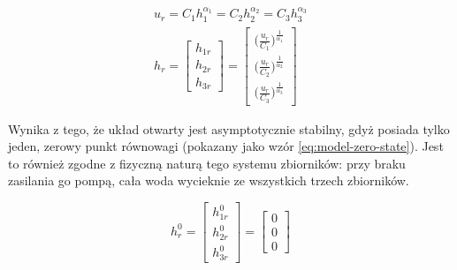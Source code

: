 \begin{equation}\label{eq:model-steady-state}
\begin{array}{lr}
u_{r} = C_{1}h_{1}^{\alpha_{1}} = C_{2}h_{2}^{\alpha_{2}} = C_{3}h_{3}^{\alpha_{3}}\\
h_{r} = \begin{bmatrix}
h_{1r}\\h_{2r}\\h_{3r}
\end{bmatrix}
=
\begin{bmatrix}
\big( \frac{\textstyle u_{r}}{\textstyle C_{1}}\big)^{\frac{\scriptstyle 1}{\scriptstyle \alpha_{1}}}\\
\big( \frac{\textstyle u_{r}}{\textstyle C_{2}}\big)^{\frac{\scriptstyle 1}{\scriptstyle \alpha_{2}}}\\
\big( \frac{\textstyle u_{r}}{\textstyle C_{3}}\big)^{\frac{\scriptstyle 1}{\scriptstyle \alpha_{3}}}
\end{bmatrix}
\end{array}
\end{equation}

Wynika z tego, że układ otwarty jest asymptotycznie stabilny, gdyż posiada tylko jeden, zerowy punkt równowagi (pokazany jako wzór \ref{eq:model-zero-state}). Jest to również zgodne z fizyczną naturą tego systemu zbiorników: przy braku zasilania go pompą, cała woda wycieknie ze wszystkich trzech zbiorników.

\begin{equation}\label{eq:model-zero-state}
h_{r}^{0} = \begin{bmatrix}
h_{1r}^{0}\\h_{2r}^{0}\\h_{3r}^{0}
\end{bmatrix} = 
\begin{bmatrix}
0\\0\\0
\end{bmatrix}
\end{equation}
